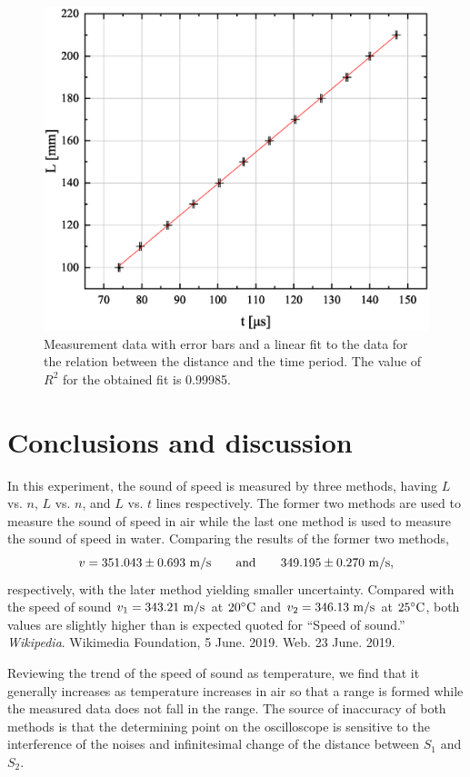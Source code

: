 \documentclass[a4paper]{report}
\begin{document}
	\begin{figure}[H]
		\centering
		\includegraphics[width=0.8\linewidth]{4.eps}
		\caption{Measurement data with error bars and a linear fit to the data for the relation between the distance and the time period. The value of $R^2$ for the obtained fit is 0.99985.}
		\label{fig:4}
	\end{figure}
	\section{Conclusions and discussion}
	In this experiment, the sound of speed is measured by three methods, having $L$ vs. $n$, $L$ vs. $n$, and $L$ vs. $t$ lines respectively. The former two methods are used to measure the sound of speed in air while the last one method is used to measure the sound of speed in water. Comparing the results of the former two methods,
	\begin{equation*}
	v=351.043\pm0.693\ \rm{m/s} \qquad \rm{and} \qquad 349.195\pm0.270\ \rm{m/s,}
	\end{equation*}
	respectively, with the later method yielding smaller uncertainty. Compared with the speed of sound $v_1=343.21\ \rm{m/s}$ at $20^\circ {\rm C}$ and $v_2=346.13\ \rm{m/s}$ at $25^\circ {\rm C}$, both values are slightly higher than is expected quoted for “Speed of sound.” \textit{Wikipedia}. Wikimedia Foundation, 5 June. 2019. Web. 23 June. 2019.
	
	Reviewing the trend of the speed of sound as temperature, we find that it generally increases as temperature increases in air so that a range is formed while the measured data does not fall in the range. The source of inaccuracy of both methods is that the determining point on the oscilloscope is sensitive to the interference of the noises and infinitesimal change of the distance between $S_1$ and $S_2$.
	
\end{document}
